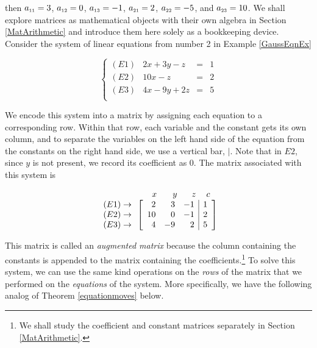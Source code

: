 \documentclass{ximera}
\begin{document}
then $a_{\mbox{\tiny$11$}} = 3$, $a_{\mbox{\tiny$12$}} = 0$, $a_{\mbox{\tiny$13$}} = -1$, $a_{\mbox{\tiny$21$}} = 2$, $a_{\mbox{\tiny$22$}} = -5$, and $a_{\mbox{\tiny$23$}} = 10$.  We shall explore matrices as mathematical objects with their own algebra in Section \ref{MatArithmetic} and introduce them here solely as a bookkeeping device.  Consider the system of linear equations  from number 2 in Example \ref{GaussEqnEx}

\[\left\{ \begin{array}{lrcr} (E1) & 2x+3y-z & = & 1 \\ 
(E2) & 10x-z & = & 2 \\ 
(E3) & 4x-9y+2z & = & 5 \\ \end{array} \right.\]  

We encode this system into a matrix by assigning each equation to a corresponding row.  Within that row, each variable and the constant gets its own column, and to separate the variables on the left hand side of the equation from the constants on the right hand side, we use a vertical bar, $|$.  Note that in $E2$, since $y$ is not present, we record its coefficient as $0$. The matrix associated with this system is 

\[ \begin{array}{c} \begin{array}{rrrrrrr} & & & \hspace{.33in} x & \hspace{.12in} y & \hspace{.1in} z & \hspace{.03in} c \\ \end{array} \\  \begin{array}{r} (E1) \rightarrow \\ (E2) \rightarrow \\ (E3) \rightarrow \end{array}  \left[ \begin{array}{rrr|r} 2 & 3 & -1 & 1\\ 10 & 0 & -1 & 2 \\ 4 & -9 & 2 & 5 \end{array} \right] \end{array} \]  

This matrix is called an \textit{augmented matrix} because the column containing the constants is appended to the matrix containing the coefficients.\footnote{We shall study the coefficient and constant matrices separately in Section \ref{MatArithmetic}.}  To solve this system, we can use the same kind operations on the \textit{rows} of the matrix that we performed on the \textit{equations} of the system. More specifically, we have the following analog of Theorem \ref{equationmoves} below.
\end{document}
